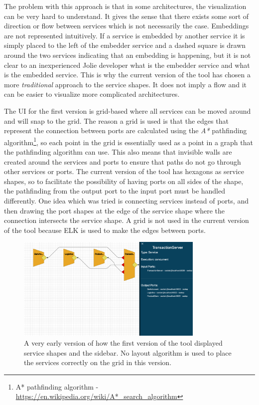 The problem with this approach is that in some architectures, the visualization can be very hard to understand.
It gives the sense that there exists some sort of direction or flow between services which is not necessarily the case.
Embeddings are not represented intuitively. If a service is embedded by another service it is simply placed to the left of the embedder service and a dashed square is drawn around the two services indicating that an embedding is happening, but it 
is not clear to an inexperienced Jolie developer what is the embedder service and what is the embedded service.
This is why the current version of the tool has chosen a more \textit{traditional} approach to the service shapes. It does not imply a flow and it can be easier to visualize more complicated architectures.

The UI for the first version is grid-based where all services can be moved around and will snap to the grid.
The reason a grid is used is that the edges that represent the connection between ports are calculated using the \textit{A*} pathfinding algorithm\footnote{A* pathfinding algorithm - \url{https://en.wikipedia.org/wiki/A*_search_algorithm}}, so each point in the grid is essentially used as a point in a graph that the pathfinding algorithm can use.
This also means that invisible walls are created around the services and ports to ensure that paths do not go through other services or ports.
The current version of the tool has hexagons as service shapes, so to facilitate the possibility of having ports on all sides of the shape, the pathfinding from the output port to the input port must be handled differently.
One idea which was tried is connecting services instead of ports, and then drawing the port shapes at the edge of the service shape where the connection intersects the service shape.
A grid is not used in the current version of the tool because ELK is used to make the edges between ports. 

\begin{figure}[t]
\center
\includegraphics[width=0.8\textwidth]{figures/old_ui.png}
\caption{A very early version of how the first version of the tool displayed service shapes and the sidebar. No layout algorithm is used to place the services correctly on the grid in this version.}
\label{figure:old_ui}
\end{figure}


